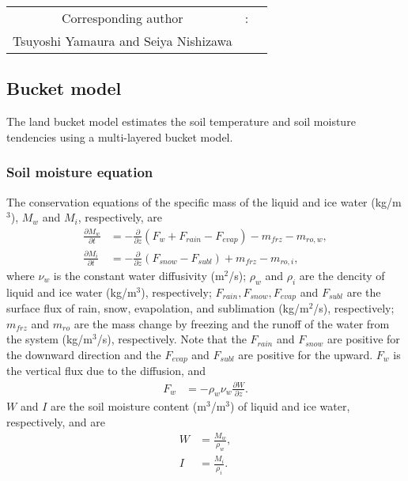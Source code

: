 {\bf \Large
\begin{tabular}{ccc}
\hline
  Corresponding author & :\\
  Tsuyoshi Yamaura and Seiya Nishizawa\\
\hline
\end{tabular}
}


\subsection{Bucket model}

The land bucket model estimates the soil temperature and soil moisture tendencies using a multi-layered bucket model.



\subsubsection{Soil moisture equation}

The conservation equations of the specific mass of the liquid and ice water (kg/m$^3$), $M_w$ and $M_i$, respectively, are
\begin{align}
  \frac{\partial M_w}{\partial t}
  &= - \frac{\partial}{\partial z} \left( F_w + F_{rain} - F_{evap} \right)
     - m_{frz} - m_{ro,w}, \label{eq:MwDt} \\
  \frac{\partial M_i}{\partial t}
  &= - \frac{\partial}{\partial z}\left( F_{snow} - F_{subl} \right) + m_{frz} - m_{ro,i}, \label{eq:MiDt}
\end{align}
where $\nu_w$ is the constant water diffusivity (m$^2$/s);
$\rho_w$ and $\rho_i$ are the dencity of liquid and ice water (kg/m$^3$), respectively;
$F_{rain}, F_{snow}, F_{evap}$ and $F_{subl}$ are the surface flux of rain, snow, evapolation, and sublimation (kg/m$^2$/s), respectively;
$m_{frz}$ and $m_{ro}$ are the mass change by freezing and the runoff of the water from the system (kg/m$^3$/s), respectively.
Note that the $F_{rain}$ and $F_{snow}$ are positive for the downward direction and the $F_{evap}$ and $F_{subl}$ are positive for the upward.
$F_w$ is the vertical flux due to the diffusion, and
\begin{align}
  F_w &= - \rho_w \nu_w\frac{\partial W}{\partial z}.
\end{align}
$W$ and $I$ are the soil moisture content (m$^3$/m$^3$) of liquid and ice water, respectively, and are
\begin{align}
 W &= \frac{M_w}{\rho_w}, \\
 I &= \frac{M_i}{\rho_i}.
\end{align}



